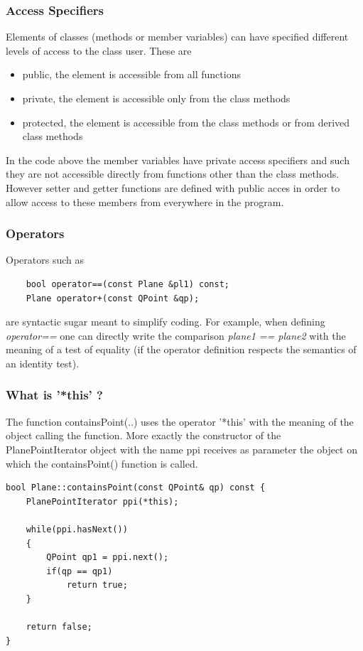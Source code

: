 \subsubsection {Access Specifiers}
Elements of classes (methods or member variables) can have specified different levels of access to the class user. These are 
\begin{itemize}
\item public, the element is accessible from all functions
\item private, the element is accessible only from the class methods
\item protected, the element is accessible from the class methods or from derived class methods
\end{itemize}  
In the code above the member variables have private access specifiers and such they are not accessible directly from functions other than the class methods. However setter and getter functions are defined with public acces in order to allow access to these members from everywhere in the program. 

\subsubsection {Operators}
Operators such as
\begin{lstlisting}
    bool operator==(const Plane &pl1) const;
    Plane operator+(const QPoint &qp);
\end{lstlisting}
are syntactic sugar meant to simplify coding. For example, when defining \textit{operator==} one can directly write the comparison \textit{ plane1 == plane2 } with the meaning of a test of equality (if the operator definition respects the semantics of an identity test). 

\subsubsection {What is '*this' ? }
The function containsPoint(..) uses the operator '*this' with the meaning of the object calling the function. More exactly the constructor of the PlanePointIterator object with the name ppi receives as parameter the object on which the containsPoint() function is called.

\begin{lstlisting}
bool Plane::containsPoint(const QPoint& qp) const {
    PlanePointIterator ppi(*this);

    while(ppi.hasNext())
    {
        QPoint qp1 = ppi.next();
        if(qp == qp1)
            return true;
    }

    return false;
}
\end{lstlisting}
